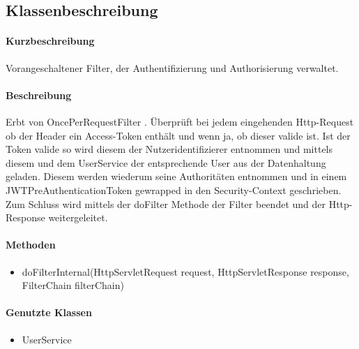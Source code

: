 \subsection{Klassenbeschreibung}%
\paragraph*{Kurzbeschreibung}
Vorangeschaltener Filter, der Authentifizierung und Authorisierung verwaltet.
\paragraph*{Beschreibung}
Erbt von \dq OncePerRequestFilter \dq. Überprüft bei jedem eingehenden Http-Request ob der Header ein Access-Token enthält und wenn ja, ob dieser valide ist. 
Ist der Token valide so wird diesem der Nutzeridentifizierer entnommen und mittels diesem und dem UserService der entsprechende
User aus der Datenhaltung geladen. Diesem werden wiederum seine Authoritäten entnommen und in einem JWTPreAuthenticationToken gewrapped
in den Security-Context geschrieben. Zum Schluss wird mittels der \dq doFilter \dq Methode der Filter beendet und der Http-Response weitergeleitet.
\paragraph*{Methoden}
\begin{itemize}
	\item doFilterInternal(HttpServletRequest request, HttpServletResponse response, FilterChain filterChain)
\end{itemize}	
\paragraph*{Genutzte Klassen}
\begin{itemize}
	\item UserService
\end{itemize}
